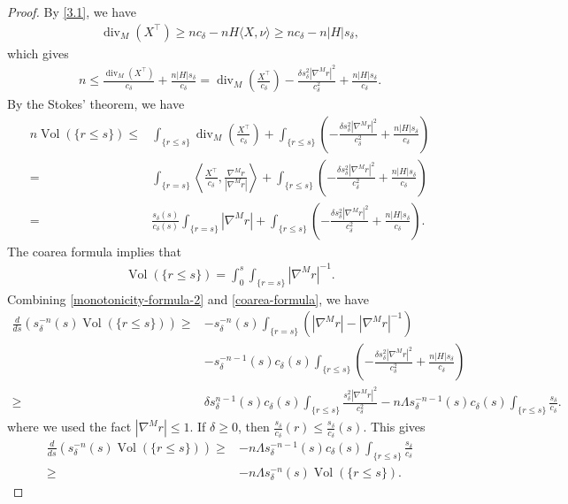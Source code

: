 \documentclass{amsart}
\numberwithin{equation}{section}
\theoremstyle{remark}
\renewcommand{\(}{\left(}
\renewcommand{\)}{\right)}
\renewcommand{\~}{\tilde}
\renewcommand{\-}{\overline}
\renewcommand{\d}{\delta}
\renewcommand{\L}{\Lambda}
\newcommand{\Vol}{\operatorname{Vol}}
\newcommand{\divv}{\operatorname{div }}
\begin{document}
\begin{proof}
By \eqref{3.1}, we have
\begin{align*}
\operatorname{div}_M(X^\top) \geq n c_\d -n H\langle X,\nu \rangle \geq n c_\d - n|H|s_\d,
\end{align*}
which gives
\begin{align}\label{monotonicity-formula-1}
n \leq \frac{\divv_M(X^\top)}{c_\d}+\frac{n|H|s_\d}{c_\d}
= \divv_M \(\frac{X^\top}{c_\d}\)-\frac{\d s_\d^2 |\nabla^M r|^2}{c_\d^2}+\frac{n|H|s_\d}{c_\d}.
\end{align}
By the Stokes' theorem, we have
\begin{align}\label{monotonicity-formula-2}
n \Vol(\{r\le s\}) \le &\int_{\{r\le s\}} \divv_M \(\frac{X^\top}{c_\d}\)+\int_{\{r\le s\}} \(-\frac{\d s_\d^2 |\nabla^M r|^2}{c_\d^2}+\frac{n|H|s_\d}{c_\d} \) \nonumber \\
=&\int_{\{r=s\}} \left\langle \frac{X^\top}{c_\d}, \frac{\nabla^M r}{|\nabla^M r|} \right\rangle +\int_{\{r\le s\}} \(-\frac{\d s_\d^2 |\nabla^M r|^2}{c_\d^2}+\frac{n|H|s_\d}{c_\d} \) \nonumber \\
=&\frac{s_\d(s)}{c_\d(s)} \int_{\{r=s\}}|\nabla^M r| +\int_{\{r\le s\}} \( -\frac{\d s_\d^2 |\nabla^M r|^2}{c_\d^2}+\frac{n|H|s_\d}{c_\d} \).
\end{align}
The coarea formula implies that
\begin{align}\label{coarea-formula}
\Vol(\{r\leq s\})=\int_0^s \int_{\{r=s\}}|\nabla^M r|^{-1}.
\end{align}
Combining \eqref{monotonicity-formula-2} and \eqref{coarea-formula}, we have
\begin{align*}
    \frac{d}{ds}\(s_\d^{-n}(s)\Vol(\{r\le s\})\)
\ge & -s_\d^{-n}(s)\int_{\{r=s\}}\(|\nabla^M r|-|\nabla^M r|^{-1}\) \\
    &-s_\d^{-n-1}(s)c_\d(s)\int_{\{r\le s\}} \( -\frac{\d s_\d^2 |\nabla^M r|^2}{c_\d^2}+\frac{n|H|s_\d}{c_\d} \)\\
\ge & \d s_\d^{n-1}(s)c_\d(s)\int_{\{r\le s\}} \frac{s_\d^2 |\nabla^M r|^2}{c_\d^2} -n\L s_\d^{-n-1}(s)c_\d(s) \int_{\{r\le s\}} \frac{s_\d}{c_\d}.
\end{align*}
where we used the fact $|\nabla^M r|\le 1$. If $\d \ge 0$, then $\frac{s_\d}{c_\d}(r)\le \frac{s_\d}{c_\d}(s)$. This gives
\begin{align*}
\frac{d}{ds}\(s_\d^{-n}(s)\Vol(\{r\le s\})\)
\ge & -n\L s_\d^{-n-1}(s)c_\d(s) \int_{\{r\le s\}} \frac{s_\d}{c_\d} \\
\ge & -n\L s_\d^{-n}(s)\Vol(\{r\le s\}).
\end{align*}

\end{proof}
\end{document}
